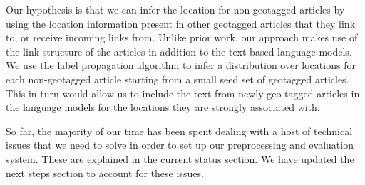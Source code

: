Our hypothesis is that we can infer the location for non-geotagged articles by using the location information present in other geotagged articles that they link to, or receive incoming links from.
Unlike prior work, our approach makes use of the link structure of the articles in addition to the text based language models.
We use the label propagation algorithm to infer a distribution over locations for each non-geotagged article starting from a small seed set of geotagged articles. This in turn would allow us to include the text from newly geo-tagged articles in the language models for the locations they are strongly associated with.

So far, the majority of our time has been spent dealing with a host of technical issues that we need to solve in order to set up our preprocessing and evaluation system. These are explained in the current status section. We have updated the next steps section to account for these issues.


